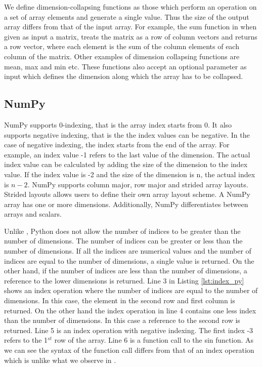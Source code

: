 We define dimension-collapsing functions as those which perform an operation on a set of array elements and generate a single value. Thus the size of the output array differs from that of the input array. For example, the \textsf{sum} function in \matlab when given as input a matrix, treats the matrix as a row of column vectors and returns a row vector, where each element is the sum of the column elements of each column of the matrix. Other examples of dimension collapsing functions are \textsf{mean}, \textsf{max} and \textsf{min} etc. These functions also accept an optional parameter as input which defines the dimension along which the array has to be collapsed. 
\subsection{NumPy}
NumPy supports 0-indexing, that is the array index starts from 0. It also supports negative indexing, that is the the index values can be negative. In the case of negative indexing, the index starts from the end of the array. For example, an index value \textsf{-1} refers to the last value of the dimension. The actual index value can be calculated by adding the size of the dimension to the index value. If the index value is -2 and the size of the dimension is n, the actual index is $n - 2$. NumPy supports column major, row major and strided array layouts. Strided layouts allows users to define their own array layout scheme. A NumPy array has one or more dimensions. Additionally, NumPy differentiates between arrays and scalars.

Unlike \matlab, Python does not allow the number of indices to be greater than the number of dimensions. The number of indices can be greater or less than the number of dimensions. If all the indices are numerical values and the number of indices are equal to the number of dimensions, a single value is returned. On the other hand, if the number of indices are less than the number of dimensions, a reference to the lower dimensions is returned. Line 3 in Listing \ref{lst:index_py} shows an index operation where the number of indices are equal to the number of dimensions. In this case, the element in the second row and first column is returned. On the other hand the index operation in line 4 contains one less index than the number of dimensions. In this case a reference to the second row is returned. Line 5 is an index operation with negative indexing. The first index -3 refers to the 1$^{st}$ row of the array.  Line 6 is a function call to the sin function. As we can see the syntax of the function call differs from that of an index operation which is unlike what we observe in \matlab. 


